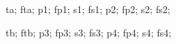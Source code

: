 {         {ta};
         {fta};
         {p1};
         {fp1};
         {s1};
         {fs1};
         {p2};
         {fp2};
         {s2};
         {fs2};
        	
	 {tb};
         {ftb};
         {p3};
         {fp3};
         {s3};
         {fs3};
         {p4};
         {fp4};
         {s4};
         {fs4};
%         
% 	
%  
	
	      
        }
